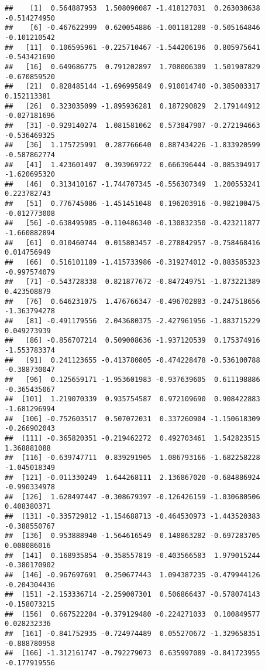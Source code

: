 \documentclass[
]{article}
\begin{document}
\begin{verbatim}
##    [1]  0.564887953  1.508090087 -1.418127031  0.263030638 -0.514274950
##    [6] -0.467622999  0.620054886 -1.001181288 -0.505164846 -0.101210542
##   [11]  0.106595961 -0.225710467 -1.544206196  0.805975641 -0.543421690
##   [16]  0.649686775  0.791202897  1.708006309  1.501907829 -0.670859520
##   [21]  0.828485144 -1.696995849  0.910014740 -0.385003317  0.152113381
##   [26]  0.323035099 -1.895936281  0.187290829  2.179144912 -0.027181696
##   [31] -0.929140274  1.081581062  0.573847907 -0.272194663 -0.536469325
##   [36]  1.175725991  0.287766640  0.887434226 -1.833920599 -0.587862774
##   [41]  1.423601497  0.393969722  0.666396444 -0.085394917 -1.620695320
##   [46]  0.313410167 -1.744707345 -0.556307349  1.200553241  0.223782743
##   [51]  0.776745086 -1.451451048  0.196203916 -0.982100475 -0.012773008
##   [56] -0.638495985 -0.110486340 -0.130832350 -0.423211877 -1.660882894
##   [61]  0.010460744  0.015803457 -0.278842957 -0.758468416  0.014756949
##   [66]  0.516101189 -1.415733986 -0.319274012 -0.883585323 -0.997574079
##   [71] -0.543728338  0.821877672 -0.847249751 -1.873221389  0.423508879
##   [76]  0.646231075  1.476766347 -0.496702883 -0.247518656 -1.363794278
##   [81] -0.491179556  2.043680375 -2.427961956 -1.883715229  0.049273939
##   [86] -0.856707214  0.509008636 -1.937120539  0.175374916 -1.553783374
##   [91]  0.241123655 -0.413780805 -0.474228478 -0.536100788 -0.388730047
##   [96]  0.125659171 -1.953601983 -0.937639605  0.611198886 -0.365435067
##  [101]  1.219070339  0.935754587  0.972109690  0.908422883 -1.681296994
##  [106] -0.752603517  0.507072031  0.337260904 -1.150618309 -0.266902043
##  [111] -0.365820351 -0.219462272  0.492703461  1.542823515  1.368881088
##  [116] -0.639747711  0.839291905  1.086793166 -1.682258228 -1.045018349
##  [121] -0.011330249  1.644268111  2.136867020 -0.684886924 -0.990334978
##  [126]  1.628497447 -0.308679397 -0.126426159 -1.030680506  0.408380371
##  [131] -0.335729812 -1.154688713 -0.464530973 -1.443520383 -0.388550767
##  [136]  0.953888940 -1.564616549  0.148863282 -0.697283705  0.008086016
##  [141]  0.168935854 -0.358557819 -0.403566583  1.979015244 -0.380170902
##  [146] -0.967697691  0.250677443  1.094387235 -0.479944126 -0.204304436
##  [151] -2.153336714 -2.259007301  0.506866437 -0.578074143 -0.158073215
##  [156]  0.667522284 -0.379129480 -0.224271033  0.100849577  0.028232336
##  [161] -0.841752935 -0.724974489  0.055270672 -1.329658351 -0.888780958
##  [166] -1.312161747 -0.792279073  0.635997089 -0.841723955 -0.177919556

\end{verbatim}
\end{document}
